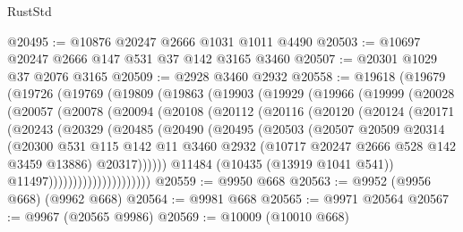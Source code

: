\begin{lexlean}{RustStd}
\begin{coremodule}
{\begin{coremodule}
{{{{{{{{{{{{{{{{{{{{{{{{{{{{{{{{{{{{{{{{{{{{{{{{{{{{{{{{{{{{{{{{{{{{{{{{{{{{{{@20495 := @10876 @20247 @2666 @1031 @1011 @4490
@20503 := @10697 @20247 @2666 @147 @531 @37 @142 @3165 @3460
@20507 := @20301 @1029 @37 @2076 @3165
@20509 := @2928 @3460 @2932
@20558 := @19618
    (@19679
      (@19726
        (@19769
          (@19809
            (@19863
              (@19903
                (@19929
                  (@19966
                    (@19999
                      (@20028
                        (@20057
                          (@20078
                            (@20094
                              (@20108
                                (@20112
                                  (@20116
                                    (@20120
                                      (@20124
                                        (@20171
                                          (@20243
                                            (@20329
                                              (@20485
                                                (@20490
                                                  (@20495
                                                    (@20503
                                                      (@20507
                                                        @20509
                                                        @20314
                                                        (@20300
                                                          @531
                                                          @115
                                                          @142
                                                          @11
                                                          @3460
                                                          @2932
                                                          (@10717
                                                            @20247
                                                            @2666
                                                            @528
                                                            @142
                                                            @3459
                                                            @13886)
                                                          @20317))))))
                                              @11484
                                              (@10435 (@13919 @1041 @541))
                                              @11497)))))))))))))))))))))
@20559 := @9950 @668
@20563 := @9952 (@9956 @668) (@9962 @668)
@20564 := @9981 @668
@20565 := @9971 @20564
@20567 := @9967 (@20565 @9986)
@20569 := @10009 (@10010 @668)
}}}}}}}}}}}}}}}}}}}}}}}}}}}}}}}}}}}}}}}}}}}}}}}}}}}}}}}}}}}}}}}}}}}}}}}}}}}}}}
\end{coremodule}}
\end{coremodule}
\end{lexlean}

